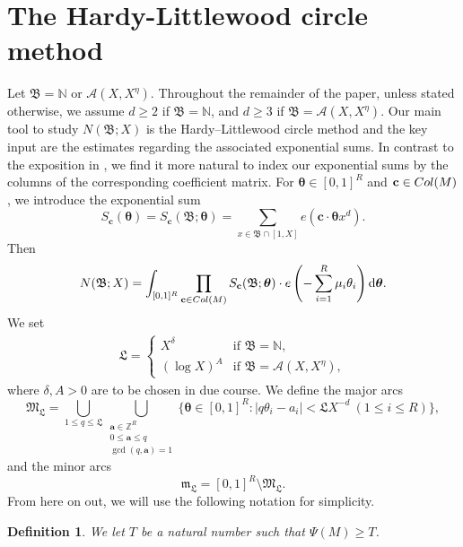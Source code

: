 \documentclass[reqno, 12pt, reqno]{amsart}
\numberwithin{equation}{section}
\newtheorem{definition}[theorem]{Definition}
\newcommand{\ZZ}{\mathbb{Z}}
\renewcommand{\leq}{\leqslant}
\renewcommand{\geq}{\geqslant}
\renewcommand{\c}{\mathbf{c}}
\renewcommand{\a}{\mathbf{a}}
\newcommand{\btheta}{\boldsymbol{\theta}}
\renewcommand{\=}{\equiv}
\begin{document}
\section{The Hardy-Littlewood circle method}
Let $\mathfrak{B} = \mathbb{N}$ or $\mathcal{A}(X, X^{\eta})$. Throughout the remainder of the paper, unless stated otherwise, we assume $d \geq 2$ if $\mathfrak{B} = \mathbb{N}$, and $d \geq 3$ if $\mathfrak{B} = \mathcal{A}(X, X^{\eta})$.
Our main tool
to study $N (\mathfrak{B}; X)$
is the Hardy--Littlewood circle method and
the key input are the estimates regarding the associated exponential sums.
In contrast to the exposition in \cite{BC}, we find it more natural to index our exponential sums by the columns of the corresponding coefficient matrix.
For $\btheta \in [0,1]^{R}$ and $\c \in \textnormal{Col}(M)$, we introduce the exponential sum
\[
S_{\c}(\btheta) = S_{\c}( \mathfrak{B}; \btheta) =  \sum_{ x \in \mathfrak{B} \cap [1, X] } e(\c \cdot\btheta x^d).
\]
Then
\begin{eqnarray}
\label{circle...}
N (\mathfrak{B}; X) = \int_{[0,1]^{R}} \prod_{\c \in \textnormal{Col} (M) } S_{\c}( \mathfrak{B}; \btheta) \cdot e\left( - \sum_{i = 1}^{R} \mu_i \theta_i   \right) \mathrm{d}\btheta.
\end{eqnarray}
We set
\begin{eqnarray}
\label{defL}
\mathfrak{L} = \begin{cases}
                 X^{\delta} & \mbox{if } \mathfrak{B} = \mathbb{N},  \\
                 (\log X)^A & \mbox{if } \mathfrak{B} = \mathcal{A}(X, X^{\eta}),
               \end{cases}
\end{eqnarray}
where $\delta, A > 0$ are to be chosen in due course.
%
We define the major arcs
$$
\mathfrak{M}_\mathfrak{L} = \bigcup_{1 \leq q \leq  \mathfrak{L} } \bigcup_{ \substack{ \a \in \ZZ^{R} \\ 0 \leq \a \leq q  \\  \gcd(q, \a) = 1  }  }
\{ \boldsymbol{\theta} \in [0,1]^{R}: \vert q \theta_i - a_i \vert <  \mathfrak{L} X^{ - d} \ (1 \leq i \leq R) \},
$$
and the minor arcs
$$
\mathfrak{m}_\mathfrak{L} = [0,1]^{R} \setminus \mathfrak{M}_\mathfrak{L}.
$$
From here on out, we will use the following notation for simplicity.
\begin{definition}
We let $T$ be a natural number such that $\Psi(M) \geq T$.
\end{definition}

\end{document}
